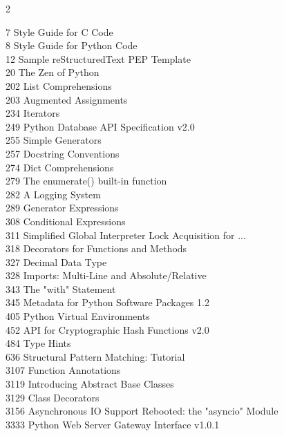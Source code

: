 \documentclass [8pt] {extarticle}
\begin{document}
    \begin {multicols} {2}

    7  Style Guide for C Code \\
    8  Style Guide for Python Code \\
    12  Sample reStructuredText PEP Template \\
    20  The Zen of Python \\
    202  List Comprehensions \\
    203  Augmented Assignments \\
    234  Iterators \\
    249  Python Database API Specification v2.0 \\
    255  Simple Generators \\
    257  Docstring Conventions \\
    274  Dict Comprehensions \\
    279  The enumerate() built-in function \\
    282  A Logging System \\
    289  Generator Expressions \\
    308  Conditional Expressions \\
    311  Simplified Global Interpreter Lock Acquisition for ... \\
    318  Decorators for Functions and Methods \\
    327  Decimal Data Type \\
    328  Imports: Multi-Line and Absolute/Relative \\
    343  The "with" Statement \\
    345  Metadata for Python Software Packages 1.2 \\
    405  Python Virtual Environments \\
    452  API for Cryptographic Hash Functions v2.0 \\
    484  Type Hints \\
    636  Structural Pattern Matching: Tutorial \\
    3107  Function Annotations \\
    3119  Introducing Abstract Base Classes \\
    3129  Class Decorators \\
    3156  Asynchronous IO Support Rebooted: the "asyncio" Module \\
    3333  Python Web Server Gateway Interface v1.0.1 \\

    \end {multicols}
\end{document}

